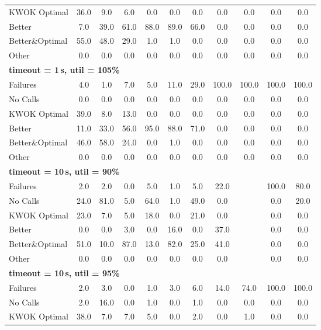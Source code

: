 \begin{tabular}{l cccccccccc}
KWOK Optimal & 36.0 & 9.0 & 6.0 & 0.0 & 0.0 & 0.0 & 0.0 & 0.0 & 0.0 & 0.0 \\
Better & 7.0 & 39.0 & 61.0 & 88.0 & 89.0 & 66.0 & 0.0 & 0.0 & 0.0 & 0.0 \\
Better\&Optimal & 55.0 & 48.0 & 29.0 & 1.0 & 1.0 & 0.0 & 0.0 & 0.0 & 0.0 & 0.0 \\
Other & 0.0 & 0.0 & 0.0 & 0.0 & 0.0 & 0.0 & 0.0 & 0.0 & 0.0 & 0.0 \\
\midrule
\multicolumn{11}{l}{\textbf{timeout = 1\,s, util = 105\%}} \\
\midrule
Failures & 4.0 & 1.0 & 7.0 & 5.0 & 11.0 & 29.0 & 100.0 & 100.0 & 100.0 & 100.0 \\
No Calls & 0.0 & 0.0 & 0.0 & 0.0 & 0.0 & 0.0 & 0.0 & 0.0 & 0.0 & 0.0 \\
KWOK Optimal & 39.0 & 8.0 & 13.0 & 0.0 & 0.0 & 0.0 & 0.0 & 0.0 & 0.0 & 0.0 \\
Better & 11.0 & 33.0 & 56.0 & 95.0 & 88.0 & 71.0 & 0.0 & 0.0 & 0.0 & 0.0 \\
Better\&Optimal & 46.0 & 58.0 & 24.0 & 0.0 & 1.0 & 0.0 & 0.0 & 0.0 & 0.0 & 0.0 \\
Other & 0.0 & 0.0 & 0.0 & 0.0 & 0.0 & 0.0 & 0.0 & 0.0 & 0.0 & 0.0 \\
\midrule
\multicolumn{11}{l}{\textbf{timeout = 10\,s, util = 90\%}} \\
\midrule
Failures & 2.0 & 2.0 & 0.0 & 5.0 & 1.0 & 5.0 & 22.0 & \text{--} & 100.0 & 80.0 \\
No Calls & 24.0 & 81.0 & 5.0 & 64.0 & 1.0 & 49.0 & 0.0 & \text{--} & 0.0 & 20.0 \\
KWOK Optimal & 23.0 & 7.0 & 5.0 & 18.0 & 0.0 & 21.0 & 0.0 & \text{--} & 0.0 & 0.0 \\
Better & 0.0 & 0.0 & 3.0 & 0.0 & 16.0 & 0.0 & 37.0 & \text{--} & 0.0 & 0.0 \\
Better\&Optimal & 51.0 & 10.0 & 87.0 & 13.0 & 82.0 & 25.0 & 41.0 & \text{--} & 0.0 & 0.0 \\
Other & 0.0 & 0.0 & 0.0 & 0.0 & 0.0 & 0.0 & 0.0 & \text{--} & 0.0 & 0.0 \\
\midrule
\multicolumn{11}{l}{\textbf{timeout = 10\,s, util = 95\%}} \\
\midrule
Failures & 2.0 & 3.0 & 0.0 & 1.0 & 3.0 & 6.0 & 14.0 & 74.0 & 100.0 & 100.0 \\
No Calls & 2.0 & 16.0 & 0.0 & 1.0 & 0.0 & 1.0 & 0.0 & 0.0 & 0.0 & 0.0 \\
KWOK Optimal & 38.0 & 7.0 & 7.0 & 5.0 & 0.0 & 2.0 & 0.0 & 1.0 & 0.0 & 0.0 \\

\end{tabular}
